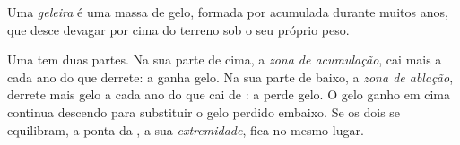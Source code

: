 \begin{definition}[Geleira]\label{def:g8:ice-on-earth:glacier}
Uma \emph{geleira} é uma massa de gelo, formada por  acumulada durante
muitos anos, que desce devagar por cima do terreno sob o seu próprio peso.
\end{definition}

Uma  tem duas partes. Na sua parte de cima, a \emph{zona de
acumulação}, cai mais  a cada ano do que derrete: a  ganha
gelo. Na sua parte de baixo, a \emph{zona de ablação}, derrete mais gelo a
cada ano do que cai de : a  perde gelo. O gelo ganho em cima
continua descendo para substituir o gelo perdido embaixo. Se os dois se
equilibram, a ponta da , a sua \emph{extremidade}, fica no mesmo
lugar.

